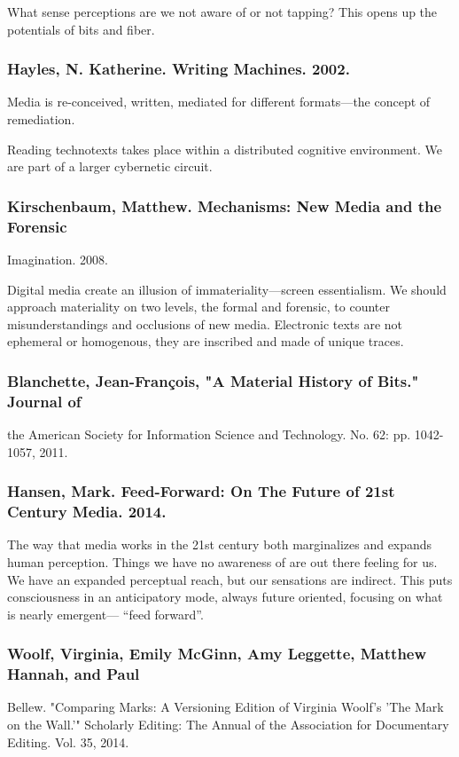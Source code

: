 \documentclass[11pt]{article}
\begin{document}
What sense perceptions are we not aware of or not tapping? This opens
up the potentials of bits and fiber.

\subsubsection{Hayles, N. Katherine. Writing Machines. 2002.}
\label{sec:org16f6f6c}
Media is re-conceived, written, mediated for different formats---the
concept of remediation.

Reading technotexts takes place within a distributed cognitive
environment. We are part of a larger cybernetic circuit.

\subsubsection{Kirschenbaum, Matthew. Mechanisms: New Media and the Forensic}
\label{sec:org1b09deb}
Imagination. 2008.

Digital media create an illusion of immateriality---screen
essentialism. We should approach materiality on two levels, the formal
and forensic, to counter misunderstandings and occlusions of new
media. Electronic texts are not ephemeral or homogenous, they are
inscribed and made of unique traces.

\subsubsection{Blanchette, Jean-François, "A Material History of Bits." Journal of}
\label{sec:org4a68282}
the American Society for Information Science and Technology. No. 62:
pp. 1042-1057, 2011.

\subsubsection{Hansen, Mark. Feed-Forward: On The Future of 21st Century Media. 2014.}
\label{sec:org22f4e93}

The way that media works in the 21st century both marginalizes and
expands human perception. Things we have no awareness of are out there
feeling for us. We have an expanded perceptual reach, but our
sensations are indirect. This puts consciousness in an anticipatory
mode, always future oriented, focusing on what is nearly emergent---
“feed forward”.

\subsubsection{Woolf, Virginia, Emily McGinn, Amy Leggette, Matthew Hannah, and Paul}
\label{sec:orgc21ff86}
Bellew. "Comparing Marks: A Versioning Edition of Virginia Woolf's
'The Mark on the Wall.'" Scholarly Editing: The Annual of the
Association for Documentary Editing. Vol. 35, 2014.
\end{document}
